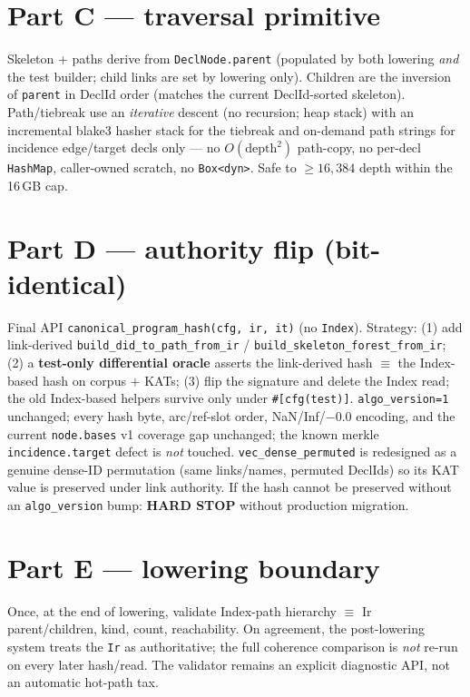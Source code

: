 \documentclass[11pt]{article}
\begin{document}
\section*{Part C --- traversal primitive}
Skeleton + paths derive from \texttt{DeclNode.parent} (populated by both lowering
\emph{and} the test builder; child links are set by lowering only). Children are
the inversion of \texttt{parent} in DeclId order (matches the current
DeclId-sorted skeleton). Path/tiebreak use an \emph{iterative} descent (no
recursion; heap stack) with an incremental blake3 hasher stack for the tiebreak
and on-demand path strings for incidence edge/target decls only --- no
$O(\text{depth}^2)$ path-copy, no per-decl \texttt{HashMap}, caller-owned scratch,
no \texttt{Box<dyn>}. Safe to $\geq 16{,}384$ depth within the 16\,GB cap.

\section*{Part D --- authority flip (bit-identical)}
Final API \texttt{canonical\_program\_hash(cfg, ir, it)} (no \texttt{Index}).
Strategy: (1) add link-derived \texttt{build\_did\_to\_path\_from\_ir} /
\texttt{build\_skeleton\_forest\_from\_ir}; (2) a \textbf{test-only differential
oracle} asserts the link-derived hash $\equiv$ the Index-based hash on corpus $+$
KATs; (3) flip the signature and delete the Index read; the old Index-based
helpers survive only under \texttt{\#[cfg(test)]}. \texttt{algo\_version=1}
unchanged; every hash byte, arc/ref-slot order, NaN/Inf/$-0.0$ encoding, and the
current \texttt{node.bases} v1 coverage gap unchanged; the known merkle
\texttt{incidence.target} defect is \emph{not} touched. \texttt{vec\_dense\_permuted}
is redesigned as a genuine dense-ID permutation (same links/names, permuted
DeclIds) so its KAT value is preserved under link authority. If the hash cannot be
preserved without an \texttt{algo\_version} bump: \textbf{HARD STOP} without
production migration.

\section*{Part E --- lowering boundary}
Once, at the end of lowering, validate Index-path hierarchy $\equiv$ Ir
parent/children, kind, count, reachability. On agreement, the post-lowering system
treats the \texttt{Ir} as authoritative; the full coherence comparison is
\emph{not} re-run on every later hash/read. The validator remains an explicit
diagnostic API, not an automatic hot-path tax.
\end{document}
